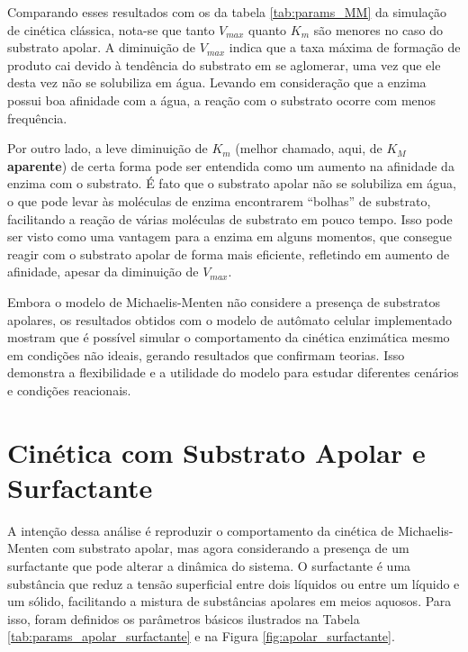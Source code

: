 \documentclass[12pt,oneside]{report}
\begin{document}
Comparando esses resultados com os da tabela \ref{tab:params_MM} da simulação de cinética clássica, nota-se que tanto $V_{max}$ quanto $K_m$ são menores no caso do substrato apolar. A diminuição de $V_{max}$ indica que a taxa máxima de formação de produto cai devido à tendência do substrato em se aglomerar, uma vez que ele desta vez não se solubiliza em água. Levando em consideração que a enzima possui boa afinidade com a água, a reação com o substrato ocorre com menos frequência.

Por outro lado, a leve diminuição de $K_m$ (melhor chamado, aqui, de $K_M$ \textbf{aparente}) de certa forma pode ser entendida como um aumento na afinidade da enzima com o substrato. É fato que o substrato apolar não se solubiliza em água, o que pode levar às moléculas de enzima encontrarem ``bolhas'' de substrato, facilitando a reação de várias moléculas de substrato em pouco tempo. Isso pode ser visto como uma vantagem para a enzima em alguns momentos, que consegue reagir com o substrato apolar de forma mais eficiente, refletindo em aumento de afinidade, apesar da diminuição de $V_{max}$.

Embora o modelo de Michaelis-Menten não considere a presença de substratos apolares, os resultados obtidos com o modelo de autômato celular implementado mostram que é possível simular o comportamento da cinética enzimática mesmo em condições não ideais, gerando resultados que confirmam teorias. Isso demonstra a flexibilidade e a utilidade do modelo para estudar diferentes cenários e condições reacionais.

\section{Cinética com Substrato Apolar e Surfactante}

A intenção dessa análise é reproduzir o comportamento da cinética de Michaelis-Menten com substrato apolar, mas agora considerando a presença de um surfactante que pode alterar a dinâmica do sistema. O surfactante é uma substância que reduz a tensão superficial entre dois líquidos ou entre um líquido e um sólido, facilitando a mistura de substâncias apolares em meios aquosos. Para isso, foram definidos os parâmetros básicos ilustrados na Tabela \ref{tab:params_apolar_surfactante} e na Figura \ref{fig:apolar_surfactante}.
\end{document}
